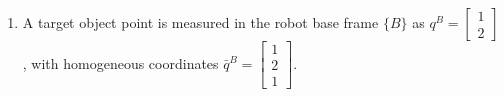 \begin{enumerate}[label=\textbf{(\alph*)}]
    To transform the given points $p_1^E = \begin{bmatrix} 0 \\ 0 \end{bmatrix}$ and $p_2^E = \begin{bmatrix} 0.5 \\ 1 \end{bmatrix}$ to the spatial frame $\{s\}$, we express them in homogeneous coordinates $\bar{p}_i^E = \begin{bmatrix} p_i^E \\ 1 \end{bmatrix}$ and apply $\bar{p}_i^s = \mathcal{G}_E^s \bar{p}_i^E$:
    \begin{align}
        \bar{p}_1^s &= \mathcal{G}_E^s \begin{bmatrix} 0 \\ 0 \\ 1 \end{bmatrix} = \begin{bmatrix} 2.2659 \\ -0.8248 \\ 1.0000 \end{bmatrix} \implies p_1^s = \begin{bmatrix} 2.2659 \\ -0.8248 \end{bmatrix} \\[0.8em]
        \bar{p}_2^s &= \mathcal{G}_E^s \begin{bmatrix} 0.5 \\ 1 \\ 1 \end{bmatrix} = \begin{bmatrix} 3.1024 \\ -1.5666 \\ 1.0000 \end{bmatrix} \implies p_2^s = \begin{bmatrix} 3.1024 \\ -1.5666 \end{bmatrix}
    \end{align}
    \item A target object point is measured in the robot base frame $\{B\}$ as $q^B = \begin{bmatrix} 1 \\ 2 \end{bmatrix}$, with homogeneous coordinates $\bar{q}^B = \begin{bmatrix} 1 \\ 2 \\ 1 \end{bmatrix}$.


\end{enumerate}
